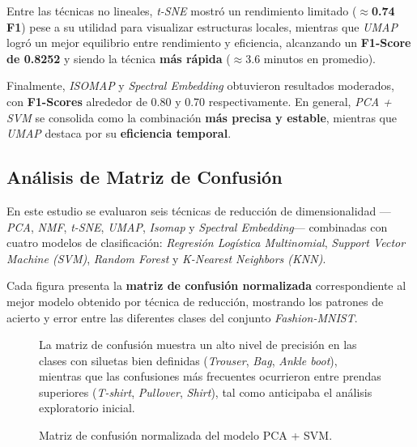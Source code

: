 \documentclass[conference]{IEEEtran}
\begin{document}
\vspace{2pt}
Entre las técnicas no lineales, \textit{t-SNE} mostró un rendimiento limitado ($\approx$\textbf{0.74 F1}) pese a su utilidad para visualizar estructuras locales, mientras que \textit{UMAP} logró un mejor equilibrio entre rendimiento y eficiencia, alcanzando un \textbf{F1-Score de 0.8252} y siendo la técnica \textbf{más rápida} ($\approx$3.6 minutos en promedio).

\vspace{2pt}
Finalmente, \textit{ISOMAP} y \textit{Spectral Embedding} obtuvieron resultados moderados, con \textbf{F1-Scores} alrededor de 0.80 y 0.70 respectivamente. En general, \textit{PCA + SVM} se consolida como la combinación \textbf{más precisa y estable}, mientras que \textit{UMAP} destaca por su \textbf{eficiencia temporal}.


\subsection{Análisis de Matriz de Confusión}
En este estudio se evaluaron seis técnicas de reducción de dimensionalidad —\textit{PCA}, \textit{NMF}, \textit{t-SNE}, \textit{UMAP}, \textit{Isomap} y \textit{Spectral Embedding}— combinadas con cuatro modelos de clasificación: \textit{Regresión Logística Multinomial}, \textit{Support Vector Machine (SVM)}, \textit{Random Forest} y \textit{K-Nearest Neighbors (KNN)}.

Cada figura presenta la \textbf{matriz de confusión normalizada} correspondiente al mejor modelo obtenido por técnica de reducción, mostrando los patrones de acierto y error entre las diferentes clases del conjunto \textit{Fashion-MNIST}.

\begin{figure}[!htbp]
\centering

\caption{Matriz de confusión normalizada del modelo PCA + SVM.}
\label{fig:matriz_confusion}
\vspace{1.2mm}
\parbox{0.95\columnwidth}{\footnotesize\raggedright La matriz de confusión muestra un alto nivel de precisión en las clases con siluetas bien definidas (\textit{Trouser}, \textit{Bag}, \textit{Ankle boot}), mientras que las confusiones más frecuentes ocurrieron entre prendas superiores (\textit{T-shirt}, \textit{Pullover}, \textit{Shirt}), tal como anticipaba el análisis exploratorio inicial.}
\end{figure}
\end{document}
